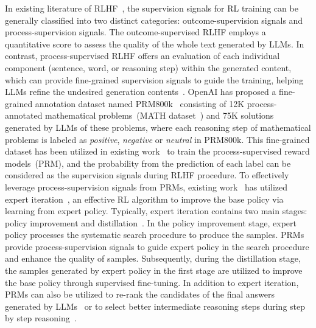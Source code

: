 {
In existing literature of RLHF~\cite{Uesato-arxiv-2022-Solving}, the supervision signals for RL training can be generally classified into two distinct categories: outcome-supervision signals and process-supervision signals.
The outcome-supervised RLHF employs a quantitative score to assess the quality of the whole text generated by LLMs. In contrast, process-supervised RLHF offers an evaluation of each individual component (\eg sentence, word, or reasoning step) within the generated content, which can provide fine-grained supervision signals to guide the training, helping LLMs refine the  undesired generation contents~\cite{Uesato-arxiv-2022-Solving, Lightman-arxiv-2023-let}.
OpenAI has proposed a fine-grained annotation dataset named PRM800k~\cite{Lightman-arxiv-2023-let} consisting of 12K process-annotated mathematical problems~(\ie MATH dataset~\cite{Hendrycks-nips-2021-Measuring}) and 75K solutions generated by LLMs of these problems, where each reasoning step of mathematical problems is labeled as \emph{positive}, \emph{negative} or \emph{neutral} in PRM800k.
This fine-grained dataset has been utilized in existing work~\cite{Ma-arxiv-2023-Let, Lightman-arxiv-2023-let} to train the process-supervised reward models~(PRM), 
and the probability from the prediction of each label can be considered as the supervision signals during RLHF procedure. 
To effectively leverage process-supervision signals from PRMs, existing work~\cite{Uesato-arxiv-2022-Solving} has utilized expert iteration~\cite{Silver-nat-2017-Mastering,Anthony-nips-2017-Thinking}, an effective RL algorithm to improve the base policy via learning from expert policy.
Typically, expert iteration contains two main stages: policy improvement and distillation~\cite{Uesato-arxiv-2022-Solving}.
In the policy improvement stage, expert policy processes the systematic search procedure to produce the samples.
PRMs provide process-supervision signals to guide expert policy in the search procedure and enhance the quality of samples.
Subsequently, during the distillation stage, the samples generated by expert policy in the first stage are utilized to improve the base policy through supervised fine-tuning.
In addition to expert iteration, PRMs can also be utilized to re-rank the candidates of the final answers generated by LLMs~\cite{Lightman-arxiv-2023-let} or to select  better intermediate reasoning steps during step by step reasoning~\cite{Ma-arxiv-2023-Let, Luo-arxiv-2023-WizardMath}.
}



